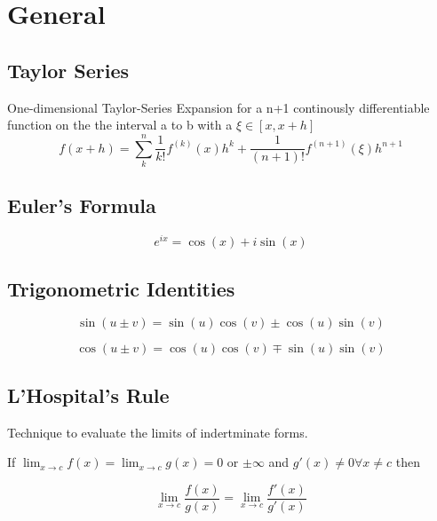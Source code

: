 \documentclass[
    a4paper,
    11pt
]{article}
\begin{document}
\tableofcontents

\clearpage

\section{General}

\subsection{Taylor Series}

One-dimensional Taylor-Series Expansion for a n+1 continously differentiable
function on the the interval a to b with a $\xi \in [x, x+h]$
\begin{equation}
    f(x+h) = \sum_k^n \frac{1}{k!} f^{(k)}(x)h^k + \frac{1}{(n+1)!}
    f^{(n+1)}(\xi)h^{n+1}
\end{equation}

\subsection{Euler's Formula}

\begin{equation}
    e^{ix} = \cos(x) + i\sin(x)
\end{equation}

\subsection{Trigonometric Identities}

\begin{equation}
    \sin(u \pm v) = \sin(u) \cos(v) \pm \cos(u) \sin(v)
\end{equation}

\begin{equation}
    \cos(u \pm v) = \cos(u) \cos(v) \mp \sin(u) \sin(v)
\end{equation}

\subsection{L'Hospital's Rule}

Technique to evaluate the limits of indertminate forms.

If $\lim_{x\to c} f(x) = \lim_{x\to c}g(x) = 0$ or $\pm \infty$ and $g'(x) \neq 0
\forall x \neq c$ then

\begin{equation}
    \lim_{x\to c} \frac{f(x)}{g(x)} = \lim_{x\to c} \frac{f'(x)}{g'(x)}
\end{equation}
\end{document}
